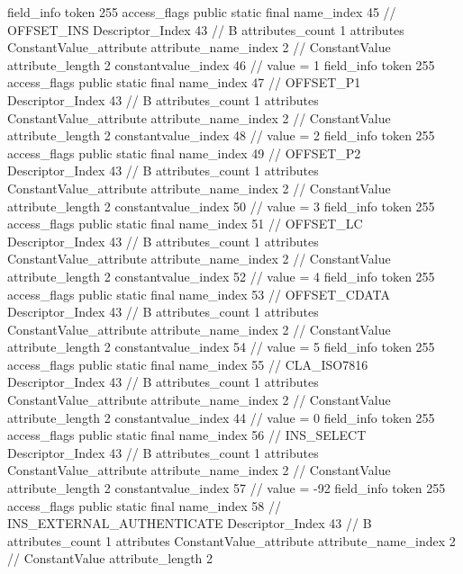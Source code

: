 {{{{{{{				}
				}
			}
			field_info {
				token	255
				access_flags	public static final
				name_index	45		// OFFSET_INS
				Descriptor_Index	43		// B
				attributes_count	1
				attributes {
				ConstantValue_attribute {
					attribute_name_index	2		// ConstantValue
					attribute_length	2
					constantvalue_index	46		// value = 1
				}
				}
			}
			field_info {
				token	255
				access_flags	public static final
				name_index	47		// OFFSET_P1
				Descriptor_Index	43		// B
				attributes_count	1
				attributes {
				ConstantValue_attribute {
					attribute_name_index	2		// ConstantValue
					attribute_length	2
					constantvalue_index	48		// value = 2
				}
				}
			}
			field_info {
				token	255
				access_flags	public static final
				name_index	49		// OFFSET_P2
				Descriptor_Index	43		// B
				attributes_count	1
				attributes {
				ConstantValue_attribute {
					attribute_name_index	2		// ConstantValue
					attribute_length	2
					constantvalue_index	50		// value = 3
				}
				}
			}
			field_info {
				token	255
				access_flags	public static final
				name_index	51		// OFFSET_LC
				Descriptor_Index	43		// B
				attributes_count	1
				attributes {
				ConstantValue_attribute {
					attribute_name_index	2		// ConstantValue
					attribute_length	2
					constantvalue_index	52		// value = 4
				}
				}
			}
			field_info {
				token	255
				access_flags	public static final
				name_index	53		// OFFSET_CDATA
				Descriptor_Index	43		// B
				attributes_count	1
				attributes {
				ConstantValue_attribute {
					attribute_name_index	2		// ConstantValue
					attribute_length	2
					constantvalue_index	54		// value = 5
				}
				}
			}
			field_info {
				token	255
				access_flags	public static final
				name_index	55		// CLA_ISO7816
				Descriptor_Index	43		// B
				attributes_count	1
				attributes {
				ConstantValue_attribute {
					attribute_name_index	2		// ConstantValue
					attribute_length	2
					constantvalue_index	44		// value = 0
				}
				}
			}
			field_info {
				token	255
				access_flags	public static final
				name_index	56		// INS_SELECT
				Descriptor_Index	43		// B
				attributes_count	1
				attributes {
				ConstantValue_attribute {
					attribute_name_index	2		// ConstantValue
					attribute_length	2
					constantvalue_index	57		// value = -92
				}
				}
			}
			field_info {
				token	255
				access_flags	public static final
				name_index	58		// INS_EXTERNAL_AUTHENTICATE
				Descriptor_Index	43		// B
				attributes_count	1
				attributes {
				ConstantValue_attribute {
					attribute_name_index	2		// ConstantValue
					attribute_length	2
}}}}}}}
